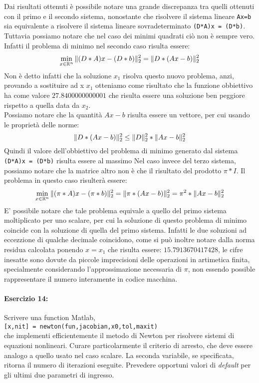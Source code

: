 \documentclass[12pt]{article}
\begin{document}
 Dai risultati ottenuti è possibile notare una grande discrepanza tra quelli ottenuti con il primo e il secondo sistema, nonostante che risolvere il sistema lineare \texttt{Ax=b}
 sia equivalente a risolvere il sistema lineare sovradeterminato \texttt{(D*A)x = (D*b)}. Tuttavia possiamo notare che nel caso dei minimi quadrati ciò non è sempre vero. Infatti il problema di minimo nel secondo caso risulta essere:
 $$\min_{x \in \mathbb{R}^n}\Arrowvert (D*A)x-(D*b) \Arrowvert_{2}^2 = \Arrowvert D*(Ax-b) \Arrowvert_{2}^2$$
 Non è detto infatti che la soluzione \(x_1\) risolva questo nuovo problema, anzi, provando a sostituire ad x \(x_1\) otteniamo come risultato
 che la funzione obbiettivo ha come valore \(27.8400000000001\) che risulta essere una soluzione ben peggiore rispetto a quella data da \(x_2\). \\
 Possiamo notare che la quantità \(Ax-b\) risulta essere un vettore, per cui usando le proprietà delle norme:
 $$\Arrowvert D*(Ax-b) \Arrowvert_{2}^2 \le \Arrowvert D \Arrowvert_{2}^2 * \Arrowvert Ax-b \Arrowvert_{2}^2 $$
 Quindi il valore dell'obbiettivo del problema di minimo generato dal sistema \texttt{(D*A)x = (D*b)} risulta essere al massimo 
 Nel caso invece del terzo sistema, possiamo notare che la matrice altro non è che il risultato del prodotto \(\pi*I\).
Il problema in questo caso risulterà essere:
$$\min_{x \in \mathbb{R}^n}\Arrowvert (\pi*A)x-(\pi*b) \Arrowvert_{2}^2 = \Arrowvert \pi*(Ax-b) \Arrowvert_{2}^2 =\pi^2 * \Arrowvert Ax-b \Arrowvert_{2}^2 $$
E' possibile notare che tale problema equivale a quello del primo sistema moltiplicato per uno scalare, per cui la soluzione di questo problema di minimo coincide con la soluzione di quella del primo sistema. Infatti le due soluzioni ad eccezzione di qualche decimale coincidono, come si può inoltre notare dalla norma residua calcolata
ponendo \(x = x_1\) che risulta essere: \(15.7913670417428\), le cifre inesatte sono dovute da piccole imprecisioni delle operazioni in artimetica finita, specialmente considerando l'approssimazione necessaria di \(\pi\), non essendo possible rappresentare il numero interamente in codice macchina.




\paragraph{Esercizio 14:}Scrivere una function Matlab,\\
\texttt{[x,nit] = newton(fun,jacobian,x0,tol,maxit)}\\
che implementi efficientemente il metodo di Newton per risolvere sistemi di equazioni nonlineari. 
Curare particolarmente il criterio di arresto, che deve essere analogo a quello usato nel caso scalare. 
La seconda variabile, se specificata, ritorna il numero di iterazioni eseguite. Prevedere opportuni valori 
di \textit{default} per gli ultimi due parametri di ingresso.
\end{document}
